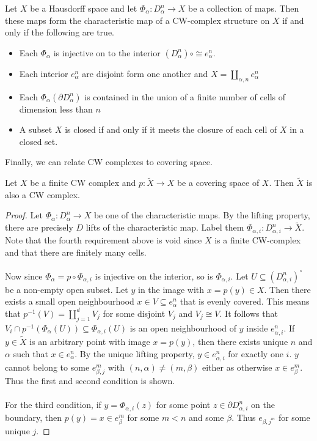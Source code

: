 \documentclass[a4paper]{article}
\begin{document}
\begin{thm}{}{} Let $X$ be a Hausdorff space and let $\Phi_\alpha:D_\alpha^n\to X$ be a collection of maps. Then these maps form the characteristic map of a CW-complex structure on $X$ if and only if the following are true. 
\begin{itemize}
\item Each $\Phi_\alpha$ is injective on to the interior $(D_\alpha^n)\circ\cong e_{\alpha}^n$. 
\item Each interior $e_\alpha^n$ are disjoint form one another and $X=\coprod_{\alpha,n}e_{\alpha}^n$
\item Each $\Phi_\alpha(\partial D_\alpha^n)$ is contained in the union of a finite number of cells of dimension less than $n$
\item A subset $X$ is closed if and only if it meets the closure of each cell of $X$ in a closed set. 
\end{itemize}
\end{thm}

Finally, we can relate CW complexes to covering space. 

\begin{prp}{}{} Let $X$ be a finite CW complex and $p:\tilde{X}\to X$ be a covering space of $X$. Then $\tilde{X}$ is also a CW complex. \tcbline
\begin{proof}
Let $\Phi_\alpha:D_\alpha^n\to X$ be one of the characteristic maps. By the lifting property, there are precisely $D$ lifts of the characteristic map. Label them $\Phi_{\alpha,i}:D_{\alpha,i}^n\to\tilde{X}$. Note that the fourth requirement above is void since $X$ is a finite CW-complex and that there are finitely many cells. \\~\\

Now since $\Phi_{\alpha}=p\circ\Phi_{\alpha,i}$ is injective on the interior, so is $\Phi_{\alpha,i}$. Let $U\subseteq(D_{\alpha,i}^n)^\circ$ be a non-empty open subset. Let $y$ in the image with $x=p(y)\in X$. Then there exists a small open neighbourhood $x\in V\subseteq e_\alpha^n$ that is evenly covered. This means that $p^{-1}(V)=\coprod_{j=1}^dV_j$ for some disjoint $V_j$ and $V_j\cong V$. It follows that $V_i\cap p^{-1}(\Phi_\alpha(U))\subseteq\Phi_{\alpha,i}(U)$ is an open neighbourhood of $y$ inside $e_{\alpha,i}^n$. If $y\in\tilde{X}$ is an arbitrary point with image $x=p(y)$, then there exists unique $n$ and $\alpha$ such that $x\in e_{\alpha}^n$. By the unique lifting property, $y\in e_{\alpha,i}^n$ for exactly one $i$. $y$ cannot belong to some $e_{\beta,j}^m$ with $(n,\alpha)\neq(m,\beta)$ either as otherwise $x\in e_\beta^m$. Thus the first and second condition is shown. \\~\\

For the third condition, if $y=\Phi_{\alpha,i}(z)$ for some point $z\in\partial D_{\alpha,i}^n$ on the boundary, then $p(y)=x\in e_\beta^m$ for some $m<n$ and some $\beta$. Thus $e_{\beta,j^m}$ for some unique $j$. 
\end{proof}
\end{prp}
\end{document}
